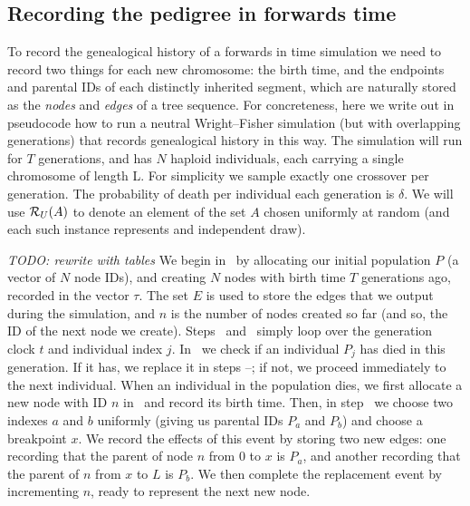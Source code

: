 \documentclass{article}
\newcommand{\jda}[1]{{\em \color{cyan} #1}}
\begin{document}
\subsection*{Recording the pedigree in forwards time}

To record the genealogical history of a forwards in time simulation
we need to record two things for each new chromosome:
the birth time, and the endpoints and parental IDs of each distinctly inherited segment,
which are naturally stored as the \emph{nodes} and \emph{edges} of a tree sequence.
For concreteness, here we write out in pseudocode how to run a neutral Wright--Fisher simulation
(but with overlapping generations) that records genealogical history in this way.
The simulation will run for $T$ generations,
and has $N$ haploid individuals, each carrying a single chromosome of length L.
For simplicity we sample exactly one crossover per generation.
The probability of death per individual each generation is $\delta$.
We will use
$\mathcal{R}_U(A)$ to denote an element of the set $A$ chosen uniformly at random
(and each such instance represents and independent draw).

\jda{TODO: rewrite with tables}
We begin in~ by allocating our initial population $P$
(a vector of $N$ node IDs),
and creating $N$ nodes with birth time $T$ generations ago, recorded in the
vector $\tau$. The set $E$ is used to store the edges that we output during the
simulation, and $n$ is the number of nodes created so far (and so, the ID of
the next node we create). Steps~ and~ simply loop over
the generation clock $t$ and individual index $j$. In~ we check if
an individual $P_j$ has died in this generation. If it has, we replace it in
steps --; if not, we proceed immediately to the next
individual. When an individual in the population dies, we first allocate
a new node with ID $n$ in~ and record its birth time. Then,
in step~ we choose two indexes $a$ and $b$ uniformly (giving us
parental IDs $P_a$ and $P_b$) and choose a breakpoint $x$. We record the effects of this
event by storing two new edges: one recording that the parent of node $n$
from $0$ to $x$ is $P_a$, and another recording that the parent of $n$
from $x$ to $L$ is $P_b$. We then complete the replacement event by incrementing
$n$, ready to represent the next new node.
\end{document}

